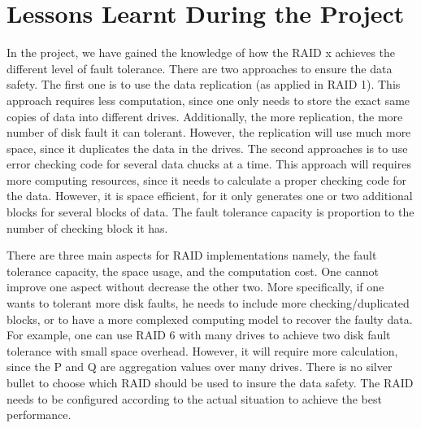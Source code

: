\section{Lessons Learnt During the Project}
In the project, we have gained the knowledge of how the RAID x achieves the different level of fault tolerance. There are two approaches to ensure the data safety. The first one is to use the data replication (as applied in RAID 1). This approach requires less computation, since one only needs to store the exact same copies of data into different drives. Additionally, the more replication, the more number of disk fault it can tolerant. However, the replication will use much more space, since it duplicates the data in the drives. The second approaches is to use error checking code for several data chucks at a time. This approach will requires more computing resources, since it needs to calculate a proper checking code for the data. However, it is space efficient, for it only generates one or two additional blocks for several blocks of data. The fault tolerance capacity is proportion to the number of checking block it has. 

There are three main aspects for RAID implementations namely, the fault tolerance capacity, the space usage, and the computation cost. One cannot improve one aspect without decrease the other two. More specifically, if one wants to tolerant more disk faults, he needs to include more checking/duplicated blocks, or to have a more complexed computing model to recover the faulty data. For example, one can use RAID 6 with many drives to achieve two disk fault tolerance with small space overhead. However, it will require more calculation, since the P and Q are aggregation values over many drives. There is no silver bullet to choose which RAID should be used to insure the data safety. The RAID needs to be configured according to the actual situation to achieve the best performance.

